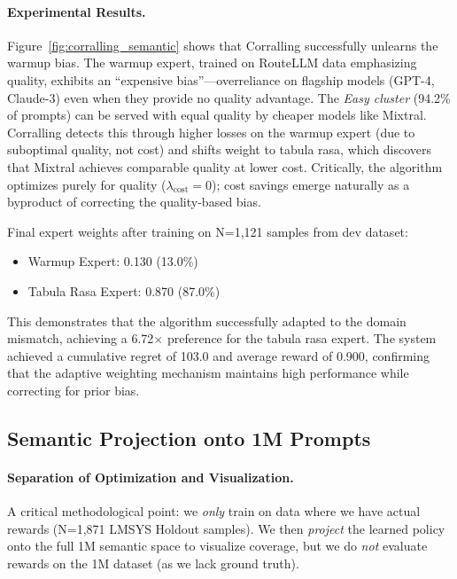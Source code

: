 \paragraph{Experimental Results.}
Figure~\ref{fig:corralling_semantic} shows that Corralling successfully unlearns the warmup bias.
The warmup expert, trained on RouteLLM data emphasizing quality, exhibits an ``expensive bias''---overreliance on flagship models (GPT-4, Claude-3) even when they provide no quality advantage.
The \emph{Easy cluster} (94.2\% of prompts) can be served with equal quality by cheaper models like Mixtral.
Corralling detects this through higher losses on the warmup expert (due to suboptimal quality, not cost) and shifts weight to tabula rasa, which discovers that Mixtral achieves comparable quality at lower cost.
Critically, the algorithm optimizes purely for quality ($\lambda_{\text{cost}} = 0$); cost savings emerge naturally as a byproduct of correcting the quality-based bias.

Final expert weights after training on N=1,121 samples from dev dataset:
\begin{itemize}[nosep]
    \item Warmup Expert: 0.130 (13.0\%)
    \item Tabula Rasa Expert: 0.870 (87.0\%)
\end{itemize}

This demonstrates that the algorithm successfully adapted to the domain mismatch, achieving a 6.72$\times$ preference for the tabula rasa expert.
The system achieved a cumulative regret of 103.0 and average reward of 0.900, confirming that the adaptive weighting mechanism maintains high performance while correcting for prior bias.



\subsection{Semantic Projection onto 1M Prompts}
\label{sec:semantic_projection}

\paragraph{Separation of Optimization and Visualization.}
A critical methodological point: we \emph{only} train on data where we have actual rewards (N=1,871 LMSYS Holdout samples).
We then \emph{project} the learned policy onto the full 1M semantic space to visualize coverage, but we do \emph{not} evaluate rewards on the 1M dataset (as we lack ground truth).

